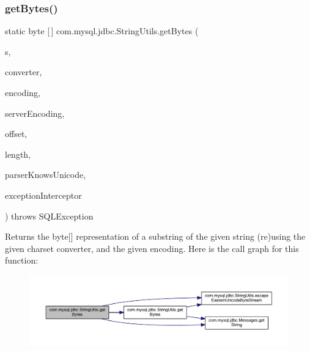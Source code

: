 \subsubsection{\texorpdfstring{get\+Bytes()}{getBytes()}\hspace{0.1cm}{\footnotesize\ttfamily [5/7]}}
{\footnotesize\ttfamily static byte \mbox{[}$\,$\mbox{]} com.\+mysql.\+jdbc.\+String\+Utils.\+get\+Bytes (\begin{DoxyParamCaption}\item[{String}]{s,  }\item[{\mbox{\hyperlink{classcom_1_1mysql_1_1jdbc_1_1_single_byte_charset_converter}{Single\+Byte\+Charset\+Converter}}}]{converter,  }\item[{String}]{encoding,  }\item[{String}]{server\+Encoding,  }\item[{int}]{offset,  }\item[{int}]{length,  }\item[{boolean}]{parser\+Knows\+Unicode,  }\item[{\mbox{\hyperlink{interfacecom_1_1mysql_1_1jdbc_1_1_exception_interceptor}{Exception\+Interceptor}}}]{exception\+Interceptor }\end{DoxyParamCaption}) throws S\+Q\+L\+Exception\hspace{0.3cm}{\ttfamily [static]}}

Returns the byte\mbox{[}\mbox{]} representation of a substring of the given string (re)using the given charset converter, and the given encoding. Here is the call graph for this function\+:
\nopagebreak
\begin{figure}[H]
\begin{center}
\leavevmode
\includegraphics[width=350pt]{classcom_1_1mysql_1_1jdbc_1_1_string_utils_a08b655dc82143b3bff5c4af85cafb9c0_cgraph}
\end{center}
\end{figure}
\mbox{\label{classcom_1_1mysql_1_1jdbc_1_1_string_utils_a6b5fe6d3bbd403144a59f29d4fb9984a}} 
